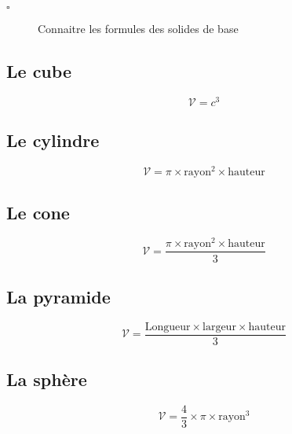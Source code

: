 \documentclass[openany]{book}
\begin{document}
\begin{seance}

\begin{description}
\item[$\square$] Connaitre les formules des solides de base
\end{description}
\end{seance}

\subsection{Le cube}

\begin{minipage}{0.47\linewidth}
$$\mathscr{V}= c^3$$ 
\end{minipage}
\hfill
\begin{minipage}{0.47\linewidth}

\end{minipage}


\subsection{Le cylindre}

\begin{minipage}{0.47\linewidth}
$$\mathscr{V}=  \pi\times  \text{rayon}^2 \times \text{hauteur} $$ 
\end{minipage}
\hfill
\begin{minipage}{0.47\linewidth}

\end{minipage}

\subsection{Le cone}

\begin{minipage}{0.47\linewidth}
$$\mathscr{V}=  \dfrac{\pi \times \text{rayon}^2 \times \text{hauteur} }{3}$$
\end{minipage}
\hfill
\begin{minipage}{0.47\linewidth}

\end{minipage}

\subsection{La pyramide}

\begin{minipage}{0.47\linewidth}
$$\mathscr{V}=  \dfrac{ \text{Longueur} \times \text{largeur} \times \text{hauteur} }{3}$$
\end{minipage}
\hfill
\begin{minipage}{0.47\linewidth}

\end{minipage}


\subsection{La sphère}

\begin{minipage}{0.47\linewidth}
$$\mathscr{V}=  \dfrac{4}{3}\times \pi\times \text{rayon}^3$$
\end{minipage}
\hfill
\begin{minipage}{0.47\linewidth}

\end{minipage}
\end{document}

